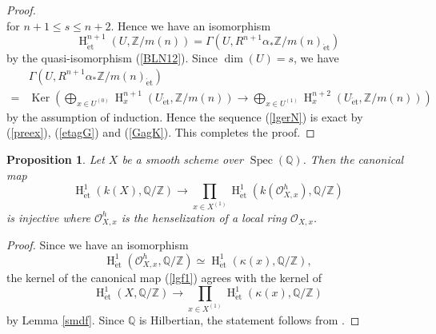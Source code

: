 \documentclass{article}
\newtheorem{prop}[thm]{\indent \sc Proposition}
\newcommand{\spec}{\operatorname{Spec}}
\newcommand{\et}{\mathrm{\acute{e}t}}
\newcommand{\HO}{\operatorname{H}}
\begin{document}
\begin{proof}
\begin{equation*}
\end{equation*}
%
for $n+1\leq s\leq n+2$. Hence
we have an isomorphism
%
\begin{equation}\label{etagG}
\HO^{n+1}_{\et}(
U, 
\mathbb{Z}/m(n)
)    
=
\Gamma\left(
U,
R^{n+1}\alpha_{*}
\mathbb{Z}/m(n)_{\et}
\right)
\end{equation}
%
by the quasi-isomorphism (\ref{BLN12}). 
Since $\operatorname{dim}(U)=s$, we have
%
\begin{align}\label{GagK}
&\Gamma\left(
U,
R^{n+1}\alpha_{*}
\mathbb{Z}/m(n)_{\et}
\right)  \nonumber  \\
=
&\operatorname{Ker}\left(
\displaystyle\bigoplus_{x\in U^{(0)}}
\HO^{n+1}_{x}(
U_{\et},
\mathbb{Z}/m(n)
)
\to
\displaystyle\bigoplus_{x\in U^{(1)}}
\HO^{n+2}_{x}(
U_{\et},
\mathbb{Z}/m(n)
)
\right)
\end{align}
%
by the assumption of induction. Hence the sequence (\ref{lgerN}) is exact 
by (\ref{preex}), (\ref{etagG}) and (\ref{GagK}).
This completes the proof.

\end{proof}
%

%
\begin{prop}\upshape\label{hass1}
Let $X$ be a smooth scheme over $\spec(\mathbb{Q})$. Then the canonical map
%
\begin{equation}\label{lgf1}
\HO^{1}_{\et}(
k(X),
\mathbb{Q}/\mathbb{Z}
)    
\to 
\prod_{x\in X^{(1)}}
\HO^{1}_{\et}(
k(
\mathcal{O}_{X, x}^{h}),
\mathbb{Q}/\mathbb{Z}
) 
\end{equation}
%
is injective where $\mathcal{O}_{X, x}^{h}$
is the henselization of a local ring $\mathcal{O}_{X, x}$.
\end{prop}
%

%
\begin{proof}\upshape
Since we have an isomorphism
%
\begin{equation*}
\HO^{1}_{\et}(
\mathcal{O}^{h}_{X, x},
\mathbb{Q}/\mathbb{Z}
)
\simeq 
\HO^{1}_{\et}(
\kappa(x),
\mathbb{Q}/\mathbb{Z}
),
\end{equation*}
%
the kernel of the canonical map (\ref{lgf1}) agrees with the kernel of
%
\begin{equation*}
\HO^{1}_{\et}(X, \mathbb{Q}/\mathbb{Z})
\to
\prod_{x\in X^{(1)}}
\HO^{1}_{\et}(
\kappa(x),
\mathbb{Q}/\mathbb{Z}
)
\end{equation*}
%
by Lemma \ref{smdf}. Since $\mathbb{Q}$ is Hilbertian, 
the statement follows from \cite[p.53, Remark 3]{W}.
\end{proof}
%
\end{document}
